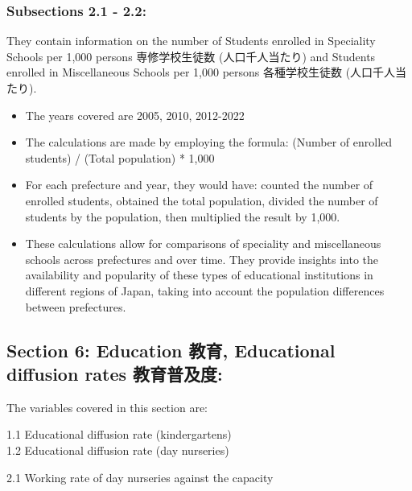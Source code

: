 \documentclass[
  12pt,
  letterpaper,
  DIV=11,
  numbers=noendperiod]{scrartcl}
\begin{document}
\hypertarget{subsections-2.1---2.2-1}{%
\subsubsection{Subsections 2.1 - 2.2:}\label{subsections-2.1---2.2-1}}

They contain information on the number of Students enrolled in
Speciality Schools per 1,000 persons 専修学校生徒数 (人口千人当たり) and
Students enrolled in Miscellaneous Schools per 1,000 persons
各種学校生徒数 (人口千人当たり).

\begin{itemize}
\item
  The years covered are 2005, 2010, 2012-2022
\item
  The calculations are made by employing the formula: (Number of
  enrolled students) / (Total population) * 1,000
\item
  For each prefecture and year, they would have: counted the number of
  enrolled students, obtained the total population, divided the number
  of students by the population, then multiplied the result by 1,000.
\item
  These calculations allow for comparisons of speciality and
  miscellaneous schools across prefectures and over time. They provide
  insights into the availability and popularity of these types of
  educational institutions in different regions of Japan, taking into
  account the population differences between prefectures.
\end{itemize}

\hypertarget{section-6-education-ux6559ux80b2-educational-diffusion-rates-ux6559ux80b2ux666eux53caux5ea6}{%
\subsection{Section 6: Education 教育, Educational diffusion rates
教育普及度:}\label{section-6-education-ux6559ux80b2-educational-diffusion-rates-ux6559ux80b2ux666eux53caux5ea6}}

The variables covered in this section are:

1.1 Educational diffusion rate (kindergartens)\\
1.2 Educational diffusion rate (day nurseries)

2.1 Working rate of day nurseries against the capacity
\end{document}
